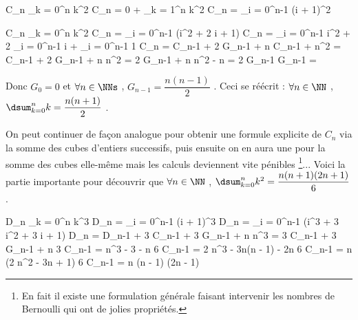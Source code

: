 \medskip

\begin{explain}[style = sar, ope = \iff]
	C_n \eqdef  \dsum_{k = 0}^{n} k^2
		\explnext{}
	C_n = 0 + \dsum_{k = 1}^{n} k^2
	C_n = \dsum_{i = 0}^{n-1} (i + 1)^2
\end{explain}

\begin{explain}[style = sar, ope = \iff]
	C_n \eqdef  \dsum_{k = 0}^{n} k^2
		\explnext{}
	C_n = \dsum_{i = 0}^{n-1} (i^2 + 2 i + 1)
		\explnext{}
	C_n = \dsum_{i = 0}^{n-1} i^2 + 2 \dsum_{i = 0}^{n-1} i + \dsum_{i = 0}^{n-1} 1
		\explnext{}
	C_n = C_{n-1} + 2 G_{n-1} + n
	C_{n-1} + n^2 = C_{n-1} + 2 G_{n-1} + n
		\explnext{}
	n^2 = 2 G_{n-1} + n
		\explnext{}
	n^2 - n = 2 G_{n-1}
		\explnext{}
	G_{n-1} = 
\end{explain}

\bigskip

Donc $G_0 = 0$ et $\forall n \in \NNs$ , $G_{n-1} = \dfrac{n(n - 1)}{2}$ .
Ceci se réécrit :
$\forall n \in \NN$ , $\dsum_{k = 0}^{n} k = \dfrac{n(n + 1)}{2}$ .

\medskip

On peut continuer de façon analogue pour obtenir une formule explicite de $C_n$ via la somme des cubes d'entiers successifs, puis ensuite on en aura une pour la somme des cubes elle-même mais les calculs deviennent vite pénibles
\footnote{
	En fait il existe une formulation générale faisant intervenir les nombres de Bernoulli qui ont de jolies propriétés.
}...
Voici la partie importante pour découvrir que 
$\forall n \in \NN$ , $\dsum_{k = 0}^{n} k^2 = \dfrac{n (n + 1) (2n + 1)}{6}$ .

\medskip

\begin{explain}[style = sar, ope = \iff]
	D_n \eqdef  \dsum_{k = 0}^{n} k^3
		\explnext{}
	D_n = \dsum_{i = 0}^{n-1} (i + 1)^3
		\explnext{}
	D_n = \dsum_{i = 0}^{n-1} (i^3 + 3 i^2 + 3 i + 1)
		\explnext{}
	D_n = D_{n-1} + 3 C_{n-1} + 3 G_{n-1} + n
		\explnext{}
	n^3 = 3 C_{n-1} + 3 G_{n-1} + n
		\explnext{}
	3 C_{n-1} = n^3 - 3 \cdot {} - n
		\explnext{}
	6 C_{n-1} = 2 n^3 - 3n(n - 1) - 2n
		\explnext{}
	6 C_{n-1} = n (2 n^2 - 3n + 1)
	6 C_{n-1} = n (n - 1) (2n - 1)
\end{explain}


